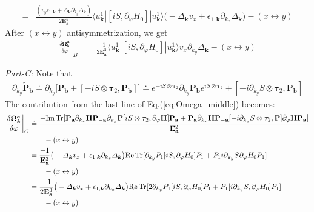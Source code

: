 \begin{subappendices}
\begin{align}
	=&\frac{(v_y\epsilon_{1,\bm{k}}+\varDelta_{\bm{k}}\partial_{k_y}\varDelta_{\bm{k}})}{2\mathbf E_{\mathbf a}^5}\langle u^1_{\bm{k}}|[iS,\partial_\varphi H_0]|u^1_{\bm{k}}\rangle \big(-\varDelta_{\bm{k}} v_x+\epsilon_{1,\bm{k}}\partial_{k_x}\varDelta_{\bm{k}}\big) -(x\leftrightarrow y)
\end{align}
After $(x\leftrightarrow y)$ antisymmetrization, we get
\begin{align}
	\left.\frac{\delta\boldsymbol\Omega^{\mathbf a}_{\bm{k}}}{\delta\varphi}\right|_{B}=&\frac{-1}{2\mathbf E_{\mathbf a}^3}\langle u^1_{\bm{k}}|[iS,\partial_\varphi H_0]|u^1_{\bm{k}}\rangle v_x\partial_{k_y}\varDelta_{\bm{k}} -(x\leftrightarrow y)
\end{align}

\emph{Part-C:} Note that 
\begin{align}
\partial_{k_y} \widetilde{\mathbf P}_{\mathbf b}\doteq \partial_{k_y}\big[\mathbf P_{\mathbf b}+[-i S\otimes\boldsymbol\tau_2,\mathbf P_{\mathbf b}]\big]\doteq e^{-i S\otimes\boldsymbol\tau_2}\partial_{k_y}\mathbf P_{\mathbf b}e^{i S\otimes\boldsymbol\tau_2}+[-i \partial_{k_y}S\otimes\boldsymbol\tau_2,\mathbf P_{\mathbf b}]
\end{align}
The contribution from the last line of Eq.(\ref{eq:Omega_middle}) becomes:
\begin{align}
	\left.\frac{\delta\boldsymbol\Omega^{\mathbf a}_{\bm{k}}}{\delta\varphi}\right|_{C} 
    &\doteq \frac{ -\mbox{Im\,Tr}[\mathbf P_{\mathbf a} \partial_{k_x} \mathbf H \mathbf P_{-\mathbf a} \partial_{k_y}\mathbf P [iS\otimes \boldsymbol\tau_2,\partial_\varphi\mathbf H] \mathbf P_{\mathbf a}+\mathbf P_{\mathbf a} \partial_{k_x} \mathbf H \mathbf P_{-\mathbf a} [-i \partial_{k_y}S\otimes\boldsymbol\tau_2,\mathbf P]\partial_\varphi\mathbf H \mathbf P_{\mathbf a}]}{\mathbf E_{\mathbf a}^2}\notag\\
    &\qquad-(x\leftrightarrow y)\notag\\
	&=\frac{-1}{\mathbf E_{\mathbf a}^3}\big(-\varDelta_{\bm{k}} v_x+\epsilon_{1,\bm{k}}\partial_{k_x}\varDelta_{\bm{k}}\big)\mbox{Re\,Tr}[\partial_{k_y}P_1[iS,\partial_\varphi H_0]P_1+P_1 i\partial_{k_y}S \partial_\varphi H_0 P_1]\notag\\
    &\qquad-(x\leftrightarrow y)\notag\\
	&=\frac{-1}{2\mathbf E_{\mathbf a}^3}\big(-\varDelta_{\bm{k}} v_x+\epsilon_{1,\bm{k}}\partial_{k_x}\varDelta_{\bm{k}}\big)\mbox{Re\,Tr}[2\partial_{k_y}P_1[iS,\partial_\varphi H_0]P_1+P_1 [i\partial_{k_y}S ,\partial_\varphi H_0] P_1]\notag\\
    &\qquad-(x\leftrightarrow y)
\end{align}


\end{subappendices}
